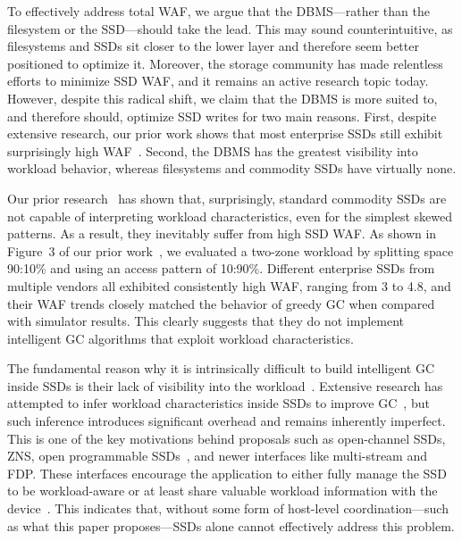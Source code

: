 To effectively address total WAF, we argue that the DBMS---rather than the filesystem or the SSD---should take the lead.
This may sound counterintuitive, as filesystems and SSDs sit closer to the lower layer and therefore seem better positioned to optimize it.
Moreover, the storage community has made relentless efforts to minimize SSD WAF, and it remains an active research topic today.
However, despite this radical shift, we claim that the DBMS is more suited to, and therefore should, optimize SSD writes for two main reasons.
First, despite extensive research, our prior work shows that most enterprise SSDs still exhibit surprisingly high WAF~\cite{ssdiq}.
Second, the DBMS has the greatest visibility into workload behavior, whereas filesystems and commodity SSDs have virtually none.

Our prior research~\cite{ssdiq} has shown that, surprisingly, standard commodity SSDs are not capable of interpreting workload characteristics, even for the simplest skewed patterns. 
As a result, they inevitably suffer from high SSD WAF.
As shown in Figure~3 of our prior work~\cite{ssdiq}, we evaluated a two-zone workload by splitting space 90:10\% and using an access pattern of 10:90\%.
Different enterprise SSDs from multiple vendors all exhibited consistently high WAF, ranging from 3 to 4.8, and their WAF trends closely matched the behavior of greedy GC when compared with simulator results.
This clearly suggests that they do not implement intelligent GC algorithms that exploit workload characteristics.

The fundamental reason why it is intrinsically difficult to build intelligent GC inside SSDs is their lack of visibility into the workload~\cite{DBLP:journals/pomacs/LangeNY25}.
Extensive research has attempted to infer workload characteristics inside SSDs to improve GC~\cite{DBLP:journals/pomacs/LangeNY25,DBLP:journals/cacm/LangeNY23,DBLP:journals/pvldb/KangCOL20},
but such inference introduces significant overhead and remains inherently imperfect.
This is one of the key motivations behind proposals such as open-channel SSDs, ZNS, open programmable SSDs~\cite{DBLP:conf/micro/ParkLLBSCC24}, and newer interfaces like multi-stream and FDP.
These interfaces encourage the application to either fully manage the SSD to be workload-aware or at least share valuable workload information with the device~\cite{SNIA_SDC_2025_TotalCostAndPerformanceOfSSDs, SNIA_SDC_2025_OptimizingHyperscaleFlashStorage}.
This indicates that, without some form of host-level coordination---such as what this paper proposes---SSDs alone cannot effectively address this problem.

